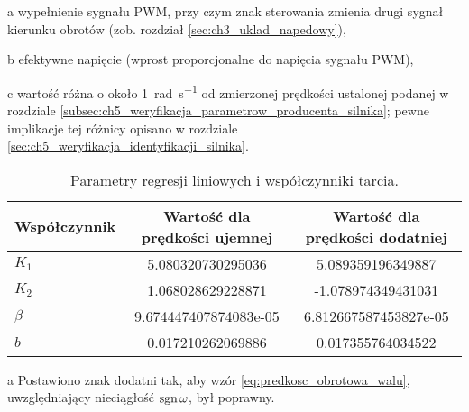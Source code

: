 \begin{table}[H]
\begin{threeparttable}
        \begin{tablenotes}
            \footnotesize
            \item[a] wypełnienie sygnału PWM, przy czym znak sterowania zmienia drugi sygnał kierunku obrotów (zob. rozdział \ref{sec:ch3_uklad_napedowy}),
            \item[b] efektywne napięcie (wprost proporcjonalne do napięcia sygnału PWM),
            \item[c] wartość różna o około \SI{1}{\radian\per\second} od zmierzonej prędkości ustalonej podanej w rozdziale \ref{subsec:ch5_weryfikacja_parametrow_producenta_silnika}; pewne implikacje tej różnicy opisano w rozdziale \ref{sec:ch5_weryfikacja_identyfikacji_silnika}.
        \end{tablenotes}
    \end{threeparttable}
\end{table}

\begin{table}[h]
    \centering
    \begin{threeparttable}
        \caption{Parametry regresji liniowych i współczynniki tarcia.}
        \label{tab:param_regresji_lin_wsp_tarcia}
        
        \begin{tabular}{l | S[round-mode=places, round-precision=6] | S[round-mode=places, round-precision=6]}
            \toprule
            Współczynnik & {Wartość dla prędkości ujemnej} & {Wartość dla prędkości dodatniej} \\
            \midrule
            $K_1$ & 5.080320730295036 & 5.089359196349887 \\
            $K_2$ & 1.068028629228871 & -1.078974349431031 \\
            $\beta$ & 9.674447407874083e-05 & 6.812667587453827e-05 \\
            $b$ & 0.017210262069886 & 0.017355764034522 \\
            \bottomrule
        \end{tabular}
        
        \begin{tablenotes}
            \footnotesize
            \item[a] Postawiono znak dodatni tak, aby wzór \eqref{eq:predkosc_obrotowa_walu}, uwzględniający nieciągłość $\operatorname{sgn} \omega$, był poprawny.
        \end{tablenotes}
    \end{threeparttable}
\end{table}

